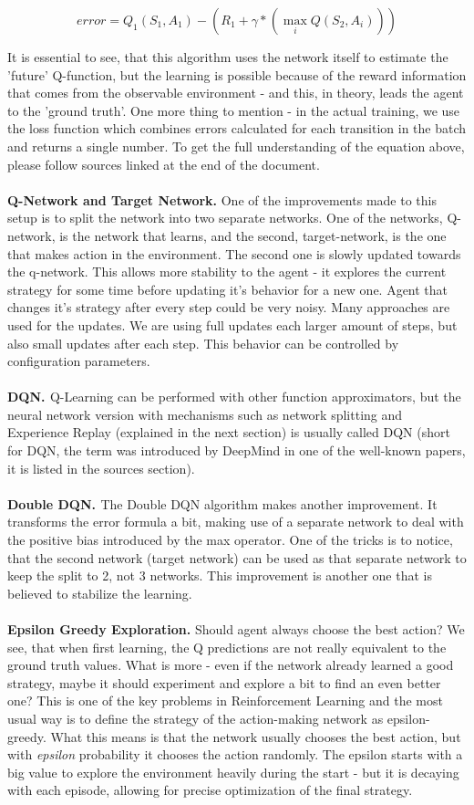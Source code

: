 \documentclass{article}
\begin{document}
\[error = Q_{1}(S_{1}, A_{1}) - ( R_{1} + \gamma * (\max_{i} Q(S_{2}, A_{i})))\]

It is essential to see, that this algorithm uses the network itself to estimate the 'future' Q-function, but the learning is possible because of the reward information that comes from the observable environment - and this, in theory, leads the agent to the 'ground truth'. One more thing to mention - in the actual training, we use the loss function which combines errors calculated for each transition in the batch and returns a single number. To get the full understanding of the equation above, please follow sources linked at the end of the document. 
\\\\
\textbf{Q-Network and Target Network.} One of the improvements made to this setup is to split the network into two separate networks. One of the networks, Q-network, is the network that learns, and the second, target-network, is the one that makes action in the environment. The second one is slowly updated towards the q-network. This allows more stability to the agent - it explores the current strategy for some time before updating it's behavior for a new one. Agent that changes it's strategy after every step could be very noisy. Many approaches are used for the updates. We are using full updates each larger amount of steps, but also small updates after each step. This behavior can be controlled by configuration parameters.
\\\\
\textbf{DQN. \cite{dqn_paper}} Q-Learning can be performed with other function approximators, but the neural network version with mechanisms such as network splitting and Experience Replay (explained in the next section) is usually called DQN (short for DQN, the term was introduced by DeepMind in one of the well-known papers, it is listed in the sources section).
\\\\
\textbf{Double DQN. \cite{doubledqn_paper}} The Double DQN algorithm makes another improvement. It transforms the error formula a bit, making use of a separate network to deal with the positive bias introduced by the max operator. One of the tricks is to notice, that the second network (target network) can be used as that separate network to keep the split to 2, not 3 networks. This improvement is another one that is believed to stabilize the learning.
\\\\
\textbf{Epsilon Greedy Exploration.} Should agent always choose the best action? We see, that when first learning, the Q predictions are not really equivalent to the ground truth values. What is more - even if the network already learned a good strategy, maybe it should experiment and explore a bit to find an even better one? This is one of the key problems in Reinforcement Learning and the most usual way is to define the strategy of the action-making network as epsilon-greedy. What this means is that the network usually chooses the best action, but with \textit{epsilon} probability it chooses the action randomly. The epsilon starts with a big value to explore the environment heavily during the start - but it is decaying with each episode, allowing for precise optimization of the final strategy.
\end{document}

